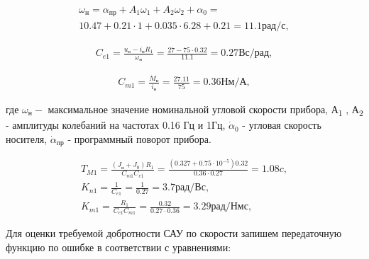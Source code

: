 \begin{equation}
\label{eq:p4:sec4/1}
\begin{multlined}
\omega _{\textit{н}}=
\alpha _{\textit{пр}} + A_{1} \omega _{1} + A_{2} \omega _{2} + \alpha _{0} =\\
10.47 + 0.21 \cdot 1 + 0.035 \cdot 6.28 + 0.21 = 11.1 \textit{рад/с},
\end{multlined}
\end{equation}

\begin{equation}
\label{eq:p4:sec4/2}
\begin{multlined}
C_{e1}=
\frac{u_\textit{н}-i_{\textit{н}}R_{1}}{ \omega _{\textit{н}}}=
\frac{27-75 \cdot 0.32}{11.1}=
0.27 \textit{Вс/рад},
\end{multlined}
\end{equation}

\begin{equation}
\label{eq:p4:sec4/3}
\begin{multlined}
C_{m1}=
\frac{M_{\textit{н}}}{i_{\textit{н}}}=
\frac{27.11}{75}=0.36 \textit{Нм/А},
\end{multlined}
\end{equation}

где  \(  \omega _{\textit{н}}- \) максимальное значение номинальной угловой скорости прибора, А\textsubscript{1} , А\textsubscript{2 }- амплитуды колебаний на частотах 0.16 Гц и 1Гц,  \( \dot \alpha _{0} \)  - угловая скорость носителя,  \( \dot \alpha _{\textit{пр}} \) - программный поворот прибора.\par

\begin{equation}
\label{eq:p4:sec4/4}
\begin{alignedat}{2}
T_{M1}=
\frac{ \left( J_{\textit{н}}+J_{0} \right) R_{1}}{C_{m1}C_{e1}}=\frac{ \left( 0.327 + 0.75 \cdot 10^{-5} \right) 0.32}{0.36 \cdot 0.27}=
1.08 \textit{c} ,\\
K_{n1} = \frac{1}{C_{e1}} = \frac{1}{0.27} = 3.7 \textit{рад/Вс},\\
K_{m1} = \frac{R_1}{C_{e1} C_{m1}} = \frac{0.32}{0.27 \cdot 0.36} = 3.29 \textit{рад/Нмс},
\end{alignedat}
\end{equation}

Для оценки требуемой добротности САУ по скорости запишем передаточную функцию по ошибке в соответствии с уравнениями:\par


